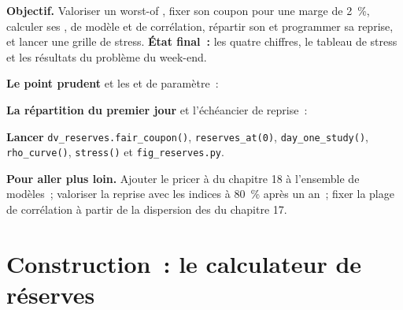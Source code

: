 \begin{tutorial}
\textbf{Objectif.} Valoriser un worst-of , fixer son coupon pour une marge de 2~\%, calculer ses , de modèle et de corrélation, répartir son  et
programmer sa reprise, et lancer une grille de stress. \textbf{État final~:} les quatre chiffres, le tableau de stress et les résultats du problème du week-end.
\begin{tutsteps}
\item \textbf{Le point prudent} et les  et de paramètre~:
\label{lst:dv:managing-an-exotic-book:prudent}
\item \textbf{La répartition du premier jour} et l'échéancier de reprise~:
\label{lst:dv:managing-an-exotic-book:dayone}
\item \textbf{Lancer} \texttt{dv\_reserves.fair\_coupon()}, \texttt{reserves\_at(0)}, \texttt{day\_one\_study()}, \texttt{rho\_curve()}, \texttt{stress()} et
\texttt{fig\_reserves.py}.
\end{tutsteps}
\textbf{Pour aller plus loin.} Ajouter le pricer à  du chapitre 18 à l'ensemble de modèles~; valoriser la reprise avec les indices à 80~\% après un an~; fixer la
plage de corrélation à partir de la dispersion des  du chapitre 17.
\end{tutorial}

\section{Construction~: le calculateur de réserves}\label{bld:dv:managing-an-exotic-book:reserves}

